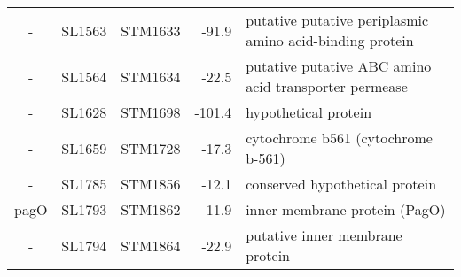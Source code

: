 \begin{table}
\begin{tabular}{ c
    				c
				c
				r
				p{2.5in}
				}
    -     & SL1563 & STM1633 & -91.9 & putative putative periplasmic amino acid-binding protein \\
    -     & SL1564 & STM1634 & -22.5 & putative putative ABC amino acid transporter permease \\
    -     & SL1628 & STM1698 & -101.4 & hypothetical protein \\
    -     & SL1659 & STM1728 & -17.3 & cytochrome b561 (cytochrome b-561) \\
    -     & SL1785 & STM1856 & -12.1 & conserved hypothetical protein \\
    pagO  & SL1793 & STM1862 & -11.9 & inner membrane protein (PagO) \\
    -     & SL1794 & STM1864 & -22.9 & putative inner membrane protein \\
    \bottomrule
    \end{tabular}%
    \label{tab:hns}%
\end{table}

